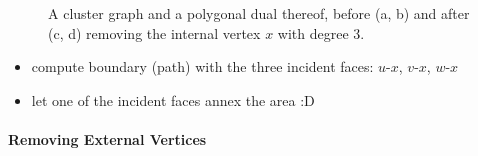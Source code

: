 \begin{figure}[H]
	\centering
	\quad
	\qquad
	\quad
	\caption{A cluster graph and a polygonal dual thereof, before (a, b) and after (c, d) removing the internal vertex $x$ with degree 3.}
	\label{fig:remove-internal-vertex-example}
\end{figure}

\begin{itemize}
	\item compute boundary (path) with the three incident faces: $u$-$x$, $v$-$x$, $w$-$x$
	\item let one of the incident faces annex the area :D
\end{itemize}

\lipsum



\paragraph{Removing External Vertices}

